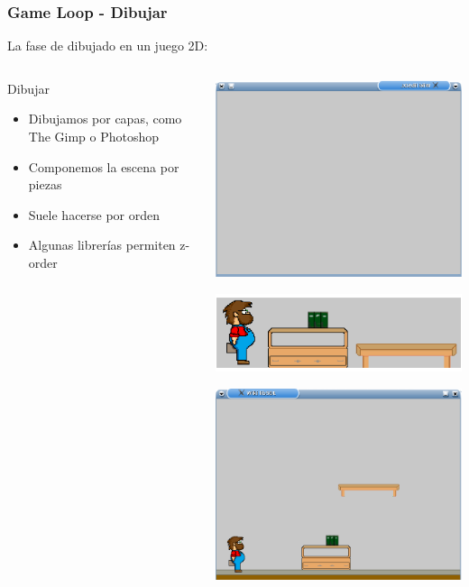\documentclass{beamer}
\begin{document}
\begin{frame}
	\frametitle{Game Loop - Dibujar}
	
	La fase de dibujado en un juego 2D:
	
	\begin{columns}[c]
	\column{175pt}
		
	\begin{block}{Dibujar}
		\begin{itemize}
			\item Dibujamos por capas, como The Gimp o Photoshop
			\item Componemos la escena por piezas
			\item Suele hacerse por orden
			\item Algunas librerías permiten z-order
		\end{itemize}            
	\end{block}
	
	\column{125pt}
	
	\begin{center}
		\includegraphics[scale=0.4]{img/pantalla.png}
		
		\includegraphics[scale=0.4]{img/elementos.png}
		
		\includegraphics[scale=0.4]{img/composicion.png}
	\end{center}	
	

\end{columns}
\end{frame}
\end{document}
